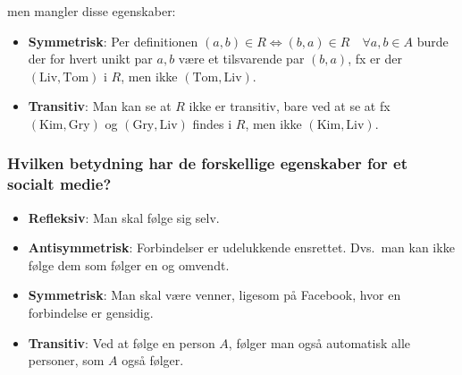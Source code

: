 men mangler disse egenskaber:

\begin{itemize}
    \item \textbf{Symmetrisk}: Per definitionen \((a, b) \in R \iff (b, a) \in R \quad\forall a, b \in A\) burde der
    for hvert unikt par \(a, b\) være et tilsvarende par \((b, a)\), fx er der \((\text{Liv}, \text{Tom})\) i \(R\),
    men ikke \((\text{Tom}, \text{Liv})\).
    \item \textbf{Transitiv}: Man kan se at \(R\) ikke er transitiv, bare ved at se at fx
    \((\text{Kim}, \text{Gry})\) og \((\text{Gry}, \text{Liv})\) findes i \(R\), men ikke \((\text{Kim},
    \text{Liv})\).
\end{itemize}

\subsubsection{Hvilken betydning har de forskellige egenskaber for et socialt medie?}

\begin{itemize}
    \item \textbf{Refleksiv}: Man skal følge sig selv.
    \item \textbf{Antisymmetrisk}: Forbindelser er udelukkende ensrettet.
    Dvs.\ man kan ikke følge dem som følger en og omvendt.
    \item \textbf{Symmetrisk}: Man skal være venner, ligesom på Facebook, hvor en forbindelse er gensidig.
    \item \textbf{Transitiv}: Ved at følge en person \(A\), følger man også automatisk alle personer, som \(A\) også
    følger.
\end{itemize}
